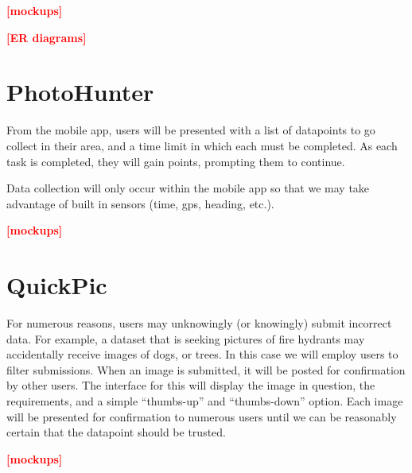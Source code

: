 \documentclass[aspectratio=169]{beamer}
\newcommand{\todo}[1]{\textcolor{red}{\textbf{[#1]}}}
\begin{document}
\begin{frame}
  \todo{mockups}
\end{frame}

\begin{frame}
  \todo{ER diagrams}
\end{frame}

\section{PhotoHunter}

\begin{frame}
  From the mobile app, users will be presented with a list of
  datapoints
  to go collect in their area, and a time limit in which each must be
  completed. As each task is completed, they will gain points,
  prompting
  them to continue.

  Data collection will only occur within the mobile app so that we may
  take advantage of built in sensors (time, gps, heading, etc.).
\end{frame}

\begin{frame}
  \todo{mockups}
\end{frame}

\section{QuickPic}

\begin{frame}
  For numerous reasons, users may unknowingly (or knowingly) submit
  incorrect data. For example, a dataset that is seeking pictures of
  fire hydrants may accidentally receive images of dogs, or trees. In
  this case we will employ users to filter submissions. When an image
  is
  submitted, it will be posted for confirmation by other users. The
  interface for this will display the image in question, the
  requirements, and a simple ``thumbs-up'' and ``thumbs-down'' option.
  Each image will be presented for confirmation to numerous users
  until
  we can be reasonably certain that the datapoint should be trusted.
\end{frame}

\begin{frame}
  \todo{mockups}
\end{frame}

\end{document}
